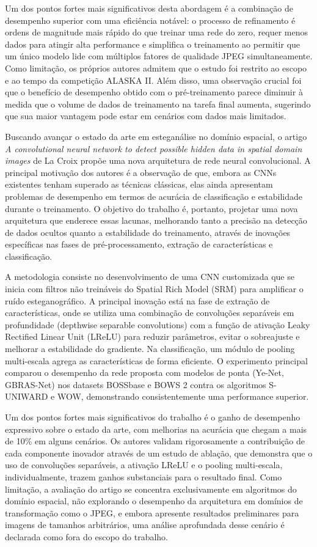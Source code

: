 \documentclass[12pt]{article}
\begin{document}
Um dos pontos fortes mais significativos desta abordagem é a combinação de
desempenho superior com uma eficiência notável: o processo de refinamento é
ordens de magnitude mais rápido do que treinar uma rede do zero, requer menos
dados para atingir alta performance e simplifica o treinamento ao permitir que
um único modelo lide com múltiplos fatores de qualidade JPEG simultaneamente.
Como limitação, os próprios autores admitem que o estudo foi restrito ao escopo
e ao tempo da competição ALASKA II. Além disso, uma observação crucial foi que
o benefício de desempenho obtido com o pré-treinamento parece diminuir à medida
que o volume de dados de treinamento na tarefa final aumenta, sugerindo que sua
maior vantagem pode estar em cenários com dados mais limitados.

Buscando avançar o estado da arte em esteganálise no domínio espacial, o artigo
\textit{A convolutional neural network to detect possible hidden data in
  spatial domain images} de La Croix \cite{croix2023CNN} propõe uma nova
arquitetura de rede neural convolucional. A principal motivação dos autores é a
observação de que, embora as CNNs existentes tenham superado as técnicas
clássicas, elas ainda apresentam problemas de desempenho em termos de acurácia
de classificação e estabilidade durante o treinamento. O objetivo do trabalho
é, portanto, projetar uma nova arquitetura que enderece essas lacunas,
melhorando tanto a precisão na detecção de dados ocultos quanto a estabilidade
do treinamento, através de inovações específicas nas fases de
pré-processamento, extração de características e classificação.

A metodologia consiste no desenvolvimento de uma CNN customizada que se inicia
com filtros não treináveis do Spatial Rich Model (SRM) para amplificar o ruído
esteganográfico. A principal inovação está na fase de extração de
características, onde se utiliza uma combinação de convoluções separáveis em
profundidade (depthwise separable convolutions) com a função de ativação Leaky
Rectified Linear Unit (LReLU) para reduzir parâmetros, evitar o sobreajuste e
melhorar a estabilidade do gradiente. Na classificação, um módulo de pooling
multi-escala agrega as características de forma eficiente. O experimento
principal comparou o desempenho da rede proposta com modelos de ponta (Ye-Net,
GBRAS-Net) nos datasets BOSSbase e BOWS 2 contra os algoritmos S-UNIWARD e WOW,
demonstrando consistentemente uma performance superior.

Um dos pontos fortes mais significativos do trabalho é o ganho de desempenho
expressivo sobre o estado da arte, com melhorias na acurácia que chegam a mais
de 10\% em alguns cenários. Os autores validam rigorosamente a contribuição de
cada componente inovador através de um estudo de ablação, que demonstra que o
uso de convoluções separáveis, a ativação LReLU e o pooling multi-escala,
individualmente, trazem ganhos substanciais para o resultado final. Como
limitação, a avaliação do artigo se concentra exclusivamente em algoritmos do
domínio espacial, não explorando o desempenho da arquitetura em domínios de
transformação como o JPEG, e embora apresente resultados preliminares para
imagens de tamanhos arbitrários, uma análise aprofundada desse cenário é
declarada como fora do escopo do trabalho.
\end{document}
